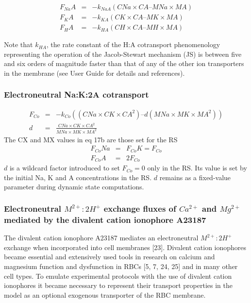 \documentclass[a4paper]{article}
\newcommand{\med}[1]{M#1}
\newcommand{\cell}[1]{C#1}
\newcommand{\MA}{\med{A}}
\newcommand{\MNa}{\med{Na}}
\newcommand{\MK}{\med{K}}
\newcommand{\MH}{\med{H}}
\newcommand{\CNa}{\cell{Na}}
\newcommand{\CK}{\cell{K}}
\newcommand{\CH}{\cell{H}}
\newcommand{\CA}{\cell{A}}
\newcommand{\F}[2]{F_{#1}#2}
\newcommand{\kk}[2]{k_{#1}#2}
\begin{document}
\setcounter{equation}{0}
\renewcommand{\theequation}{16.\alph{equation}}
\begin{eqnarray}
\F{Na}{A} &=& - \kk{NaA}{}(\CNa\times\CA – \MNa\times\MA) \\
\F{K}{A} &=& - \kk{KA}{}(\CK\times\CA – \MK\times\MA) \\
\F{H}{A} &=& - \kk{HA}{}(\CH\times\CA – \MH\times\MA) 
\end{eqnarray}

Note that $\kk{HA}{}$, the rate constant of the H:A cotransport phenomenology representing the operation of the Jacob-Stewart mechanism (JS) is between five and six orders of magnitude faster than that of any of the other ion transporters in the membrane (see User Guide for details and references).  

\setcounter{equation}{0}
\renewcommand{\theequation}{17.\alph{equation}}

\subsubsection{Electroneutral Na:K:2A cotransport}

\begin{eqnarray}
\F{Co}{} &=& -\kk{Co}{}((CNa\times\CK\times\CA^2) – d(MNa\times\MK\times\MA^2)) \\
d &=& \frac{\CNa\times\CK\times\CA^2}{\MNa\times\MK\times\MA^2}
\end{eqnarray}
The CX and MX values in eq 17b are those set for the RS 
\begin{eqnarray}
\F{Co}{Na} &=& \F{Co}{K} = \F{Co}{}\\
\F{Co}{A} &=& 2\F{Co}{}
\end{eqnarray}
$d$ is a wildcard factor introduced to set $\F{Co}{} = 0$ only in the RS. Its value is set by the initial Na, K and A concentrations in the RS. $d$ remains as a fixed-value parameter during dynamic state computations.    

\subsubsection{Electroneutral $M^{2+}:2H^+$ exchange fluxes of $Ca^{2+}$ and $Mg^{2+}$ mediated by the divalent cation ionophore A23187}

The divalent cation ionophore A23187 mediates an electroneutral $M^{2+}:2H^+$ exchange when incorporated into cell membranes [23]. Divalent cation ionophores became essential and extensively used tools in research on calcium and magnesium function and dysfunction in RBCs [5, 7, 24, 25] and in many other cell types. To emulate experimental protocols with the use of divalent cation ionophores it became necessary to represent their transport properties in the model as an optional exogenous transporter of the RBC membrane.  
\end{document}
